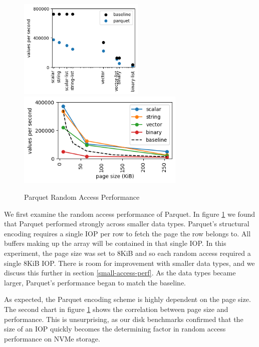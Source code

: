 \documentclass[sigconf, nonacm]{acmart}
\begin{document}
\begin{figure}[h]
    \centering
    \includegraphics[width=6cm]{figures/take_parquet.png}
    \includegraphics[width=8cm]{figures/parquet_page.png}
    \caption{Parquet Random Access Performance}
    \label{fig:parquet-random}
\end{figure}

We first examine the random access performance of Parquet. In figure \ref{fig:parquet-random} we found that Parquet performed strongly across smaller data types.  Parquet's structural encoding requires a single IOP per row to fetch the page the row belongs to.  All buffers making up the array will be contained in that single IOP.  In this experiment, the page size was set to 8KiB and so each random access required a single 8KiB IOP.  There is room for improvement with smaller data types, and we discuss this further in section \ref{small-access-perf}.  As the data types became larger, Parquet's performance began to match the baseline.

As expected, the Parquet encoding scheme is highly dependent on the page size.  The second chart in figure \ref{fig:parquet-random} shows the correlation between page size and performance.  This is unsurprising, as our disk benchmarks confirmed that the size of an IOP quickly becomes the determining factor in random access performance on NVMe storage.
\end{document}
